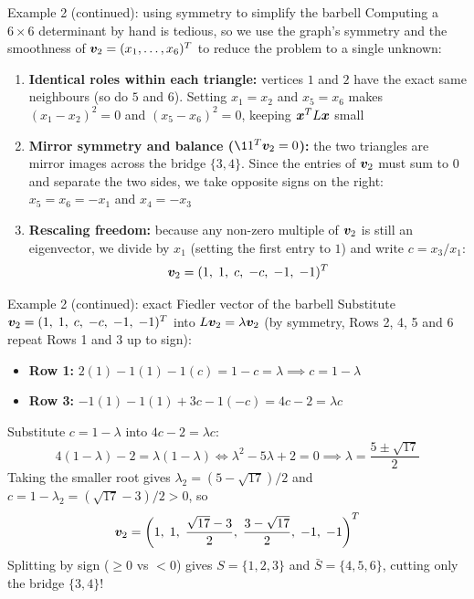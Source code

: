 \documentclass[aspectratio=169]{beamer}\usepackage[]{graphicx}\usepackage[]{xcolor}
\begin{document}
\begin{frame}{Example 2 (continued): using symmetry to simplify the barbell}
Computing a $6 \times 6$ determinant by hand is tedious, so we use the graph's symmetry and the smoothness of $\bm{v}_2 = (x_1, \ldots, x_6)^T$ to reduce the problem to a single unknown:
\vfill
\begin{enumerate}
\item \textbf{Identical roles within each triangle:} vertices $1$ and $2$ have the exact same neighbours (so do $5$ and $6$).
Setting $x_1 = x_2$ and $x_5 = x_6$ makes $(x_1 - x_2)^2 = 0$ and $(x_5 - x_6)^2 = 0$, keeping $\bm{x}^T L \bm{x}$ small
\vfill
\item \textbf{Mirror symmetry and balance ($\11^T \bv_2 = 0$):} the two triangles are mirror images across the bridge $\{3, 4\}$.
Since the entries of $\bm{v}_2$ must sum to $0$ and separate the two sides, we take opposite signs on the right: $x_5 = x_6 = -x_1$ and $x_4 = -x_3$
\vfill
\item \textbf{Rescaling freedom:} because any non-zero multiple of $\bm{v}_2$ is still an eigenvector, we divide by $x_1$ (setting the first entry to $1$) and write $c = x_3 / x_1$:
\[
\bm{v}_2 = (1, \; 1, \; c, \; -c, \; -1, \; -1)^T
\]
\end{enumerate}
\end{frame}


\begin{frame}{Example 2 (continued): exact Fiedler vector of the barbell}
Substitute $\bm{v}_2 = (1, \; 1, \; c, \; -c, \; -1, \; -1)^T$ into $L\bm{v}_2 = \lambda \bm{v}_2$ (by symmetry, Rows 2, 4, 5 and 6 repeat Rows 1 and 3 up to sign):
\begin{itemize}
\item \textbf{Row 1:} $2(1) - 1(1) - 1(c) = 1 - c = \lambda \implies c = 1 - \lambda$
\item \textbf{Row 3:} $-1(1) - 1(1) + 3c - 1(-c) = 4c - 2 = \lambda c$
\end{itemize}
\vfill
Substitute $c = 1 - \lambda$ into $4c - 2 = \lambda c$:
\[
4(1 - \lambda) - 2 = \lambda(1 - \lambda) \iff \lambda^2 - 5\lambda + 2 = 0 \implies \lambda = \frac{5 \pm \sqrt{17}}{2}
\]
\vfill
Taking the smaller root gives $\lambda_2 = (5 - \sqrt{17})/2$ and $c = 1 - \lambda_2 = (\sqrt{17} - 3)/2 > 0$, so
\[
\bm{v}_2 = \left(1, \; 1, \; \frac{\sqrt{17} - 3}{2}, \; \frac{3 - \sqrt{17}}{2}, \; -1, \; -1\right)^T
\]
Splitting by sign ($\ge 0$ vs $< 0$) gives $S = \{1, 2, 3\}$ and $\bar{S} = \{4, 5, 6\}$, cutting only the bridge $\{3, 4\}$!
\end{frame}
\end{document}
